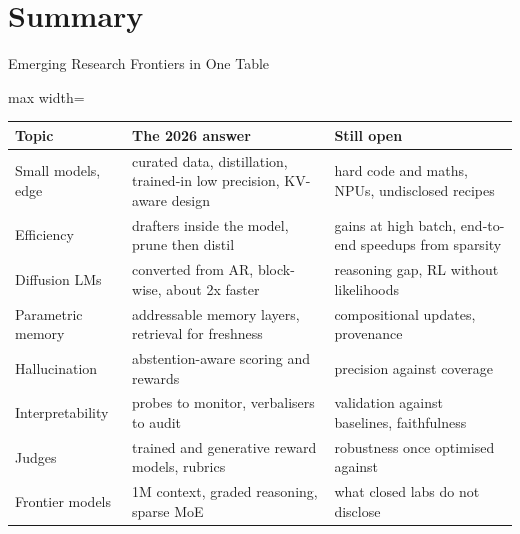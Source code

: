 \section{Summary}

\begin{frame}{Emerging Research Frontiers in One Table}
    \begin{center}
    \footnotesize
    \renewcommand{\arraystretch}{1.13}
    \begin{adjustbox}{max width=\linewidth}\begin{tabular}{>{\raggedright\arraybackslash}p{2.5cm}>{\raggedright\arraybackslash}p{5.3cm}>{\raggedright\arraybackslash}p{5.0cm}}
        \toprule
        \textbf{Topic} & \textbf{The 2026 answer} & \textbf{Still open} \\
        \midrule
        Small models, edge & curated data, distillation, trained-in low precision, KV-aware design & hard code and maths, NPUs, undisclosed recipes \\
        Efficiency & drafters inside the model, prune then distil & gains at high batch, end-to-end speedups from sparsity \\
        Diffusion LMs & converted from AR, block-wise, about 2x faster & reasoning gap, RL without likelihoods \\
        Parametric memory & addressable memory layers, retrieval for freshness & compositional updates, provenance \\
        Hallucination & abstention-aware scoring and rewards & precision against coverage \\
        Interpretability & probes to monitor, verbalisers to audit & validation against baselines, faithfulness \\
        Judges & trained and generative reward models, rubrics & robustness once optimised against \\
        Frontier models & 1M context, graded reasoning, sparse MoE & what closed labs do not disclose \\
        \bottomrule
    \end{tabular}\end{adjustbox}
    \end{center}
    \vspace{0.1em}
\end{frame}

